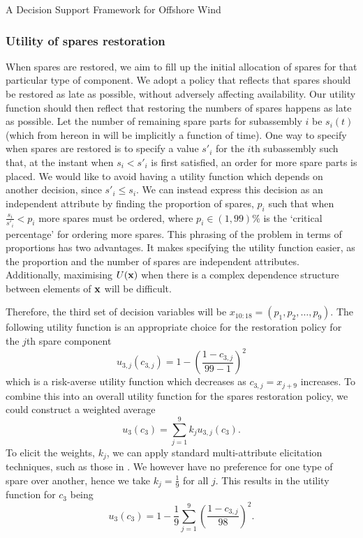 \begin{chapter}{A Decision Support Framework for Offshore Wind \label{Ch:ds-for-ow}}
\subsubsection{Utility of spares restoration}
When spares are restored, we aim to fill up the initial allocation of spares for that particular type of component. We adopt a policy that reflects that spares should be restored as late as possible, without adversely affecting availability. Our utility function should then reflect that restoring the numbers of spares happens as late as possible. Let the number of remaining spare parts for subassembly $i$ be $s_i (t)$ (which from hereon in will be implicitly a function of time). One way to specify when spares are restored is to specify a value $s'_i$ for the $i$th subassembly such that, at the instant when $s_i < s'_i$ is first satisfied, an order for more spare parts is placed. We would like to avoid having a utility function which depends on another decision, since $s'_i \leq s_i$. We can instead express this decision as an independent attribute by finding the proportion of spares, $p_i$ such that when $\frac{s_i}{s'_i} < p_i$ more spares must be ordered, where $p_i \in (1, 99)\%$ is the `critical percentage' for ordering more spares. This phrasing of the problem in terms of proportions has two advantages. It makes specifying the utility function easier, as the proportion and the number of spares are independent attributes. Additionally, maximising $U(\mathbf{x})$ when there is a complex dependence structure between elements of $\mathbf{x}$ will be difficult.

Therefore, the third set of decision variables will be $x_{10:18} = (p_1, p_2, \ldots, p_9)$. The following utility function is an appropriate choice for the restoration policy for the $j$th spare component
\begin{equation}
 u_{3,j}(c_{3,j}) = 1 - \left(\frac{1 - c_{3, j}}{99 - 1}\right)^2
\end{equation}
which is a risk-averse utility function which decreases as $c_{3, j} = x_{j+9}$ increases. To combine this into an overall utility function for the spares restoration policy, we could construct a weighted average
\begin{equation}
 u_3 (c_3) = \sum_{j = 1}^9 k_j u_{3,j}(c_3).
\end{equation}
To elicit the weights, $k_j$, we can apply standard multi-attribute elicitation techniques, such as those in \citet{Gonzalez2018}. We however have no preference for one type of spare over another, hence we take $k_j = \frac{1}{9}$ for all $j$. This results in the utility function for $c_3$ being
\begin{equation}
 u_3(c_3) = 1 - \frac{1}{9}\sum_{j=1}^9 \left(\frac{1 - c_{3, j}}{98}\right)^2.
\end{equation}

\end{chapter}
